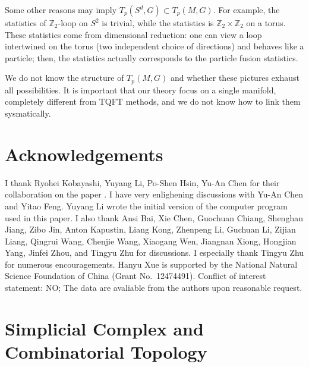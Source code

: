 \documentclass[reprint, amsmath, amssymb, showpacs, floatfix, longbibliography, aps, twocolumn, superscriptaddress, nofootinbib]{revtex4-2}
\newcommand{\ZZ}{{\mathbb Z}}
\theoremstyle{definition}
\begin{document}
Some other reasons may imply $T_p(S^d,G)\subset T_p(M,G)$. For example, the statistics of $\ZZ_2$-loop on $S^2$ is trivial, while the statistics is $\ZZ_2\times \ZZ_2$ on a torus. These statistics come from dimensional reduction: one can view a loop intertwined on the torus (two independent choice of directions) and behaves like a particle; then, the statistics actually corresponds to the particle fusion statistics.

We do not know the structure of $T_p(M,G)$ and whether these pictures exhaust all possibilities. It is important that our theory focus on a single manifold, completely different from TQFT methods, and we do not know how to link them sysmatically.

\section{Acknowledgements}
I thank Ryohei Kobayashi, Yuyang Li, Po-Shen Hsin, Yu-An Chen for their collaboration on the paper \cite{Previous}. I have very enlighening discussions with Yu-An Chen and Yitao Feng. Yuyang Li wrote the initial version of the computer program used in this paper. I also thank Ansi Bai, Xie Chen, Guochuan Chiang, Shenghan Jiang, Zibo Jin, Anton Kapustin, Liang Kong, Zhenpeng Li, Guchuan Li, Zijian Liang, Qingrui Wang, Chenjie Wang, Xiaogang Wen, Jiangnan Xiong, Hongjian Yang, Jinfei Zhou, and Tingyu Zhu for discussions. I especially thank Tingyu Zhu for numerous encouragements. Hanyu Xue is supported by the National Natural Science Foundation of China (Grant No.~12474491). Conflict of interest statement: NO; The data are avaliable from the authors upon reasonable request.


\appendix
\onecolumngrid   

\FloatBarrier

\section{Simplicial Complex and Combinatorial Topology}\label{appendixSimplicialComplex}
\end{document}
